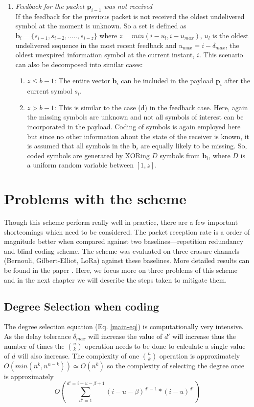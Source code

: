 \begin{enumerate}
\begin{enumerate}
		\end{enumerate}
	\item \textit{Feedback for the packet $\mathbf{p}_{i-1}$ was  not received}\\
	If the feedback for the previous packet is not received the oldest undelivered symbol at the moment is unknown. So a set is defined as $\mathbf{b}_i = \{s_{i-1}, s_{i-2},.....,s_{i-z}\}$ where $z = min(i-u_l, i-u_{max})$, $u_l$ is the oldest undelivered sequence in the most recent feedback and $u_{max} = i-\delta_{max}$, the oldest unexpired information symbol at the current instant, $i$. This scenario can also be decomposed into similar cases:
	\begin{enumerate}
		\item $z \leq b-1$: The entire vector $\mathbf{b}_i$ can be included in the payload $\mathbf{p}_i$ after the current symbol $s_i$.
		\item $z > b-1$: This is similar to the case (d) in the feedback case. Here, again the missing symbols are unknown and not all symbols of interest can be incorporated in the payload. Coding of symbols is again employed here but since no other information about the state of the receiver is known, it is assumed that all symbols in the $\mathbf{b}_i$ are equally likely to be missing. So, coded symbols are generated by XORing $D$ symbols from $\mathbf{b}_i$, where $D$ is a uniform random variable between $[1, z]$.	
	\end{enumerate}
\end{enumerate}


\section{Problems with the scheme}
\label{problems}
Though this scheme perform really well in practice, there are a few important shortcomings which need to be considered. The packet reception rate is a order of magnitude better when compared against two baselines---repetition redundancy and blind coding scheme. The scheme was evaluated on three erasure channels (Bernouli, Gilbert-Elliot, LoRa) against these baselines. More detailed results can be found in the paper \cite{borkotokyicc}. Here, we focus more on three problems of this scheme and in the next chapter we will describe the steps taken to mitigate them.

\subsection{Degree Selection when coding}
\label{degree-selection}
The degree selection equation (Eq. \ref{main-eq}) is computationally very intensive. As the delay tolerance $\delta_{max}$ will increase the value of $d'$ will increase thus the number of times the $\binom{n}{k}$ operation needs to be done to calculate a single value of $d$ will also increase. The complexity of one $\binom{n}{k}$ operation is approximately $O(min(n^k, n^{n-k})) \simeq O(n^k)$ so the complexity of selecting the degree once is approximately
\[
O\left(\sum \limits_{d'=1}^{d'=i-u-\beta +1}(i-u-\beta)^{d'-1} * (i-u)^{d'}\right)
\]

